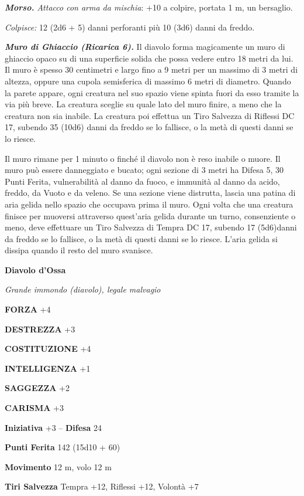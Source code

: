 \begin{multicols}{2}
\textit{\textbf{Morso.} Attacco con arma da mischia}: +10 a colpire, portata 1 m, un bersaglio.

\textit{Colpisce:} 12 (2d6 + 5) danni perforanti più 10 (3d6) danni da freddo.

\textit{\textbf{Muro di Ghiaccio (Ricarica 6).}} Il diavolo forma magicamente un muro di ghiaccio opaco su di una superficie solida che possa vedere entro 18 metri da lui. Il muro è spesso 30 centimetri e largo fino a 9 metri per un massimo di 3 metri di altezza, oppure  una cupola semisferica di massimo 6 metri di diametro. Quando la  parete appare, ogni creatura nel suo spazio viene spinta fuori da esso  tramite la via più breve. La creatura sceglie su quale lato del muro  finire, a meno che la creatura non sia inabile. La creatura poi  effettua un Tiro Salvezza di Riflessi DC 17, subendo 35 (10d6) danni da freddo se lo fallisce, o la metà di questi danni se lo riesce.

Il muro rimane per 1 minuto o finché il diavolo non è reso inabile o muore. Il muro può essere danneggiato e bucato; ogni sezione di 3 metri ha Difesa 5, 30 Punti Ferita, vulnerabilità al danno da fuoco, e immunità al danno da acido, freddo, da Vuoto e da veleno. Se una sezione viene distrutta, lascia una patina di aria gelida nello spazio che occupava prima il muro. Ogni volta che una creatura finisce per muoversi attraverso quest'aria gelida durante un turno, consenziente o meno, deve effettuare un Tiro Salvezza di Tempra DC 17, subendo 17 (5d6)danni da freddo se lo fallisce, o la metà di questi danni se lo riesce. L'aria gelida si dissipa quando il resto del muro svanisce.


\medskip{}\textbf{Diavolo d'Ossa}

\textit{Grande immondo (diavolo), legale malvagio}

\textbf{FORZA} +4

\textbf{DESTREZZA} +3

\textbf{COSTITUZIONE} +4

\textbf{INTELLIGENZA} +1

\textbf{SAGGEZZA} +2

\textbf{CARISMA} +3

\textbf{Iniziativa} +3 -- \textbf{Difesa} 24

\textbf{Punti Ferita} 142 (15d10 + 60)

\textbf{Movimento} 12 m, volo 12 m

\textbf{Tiri Salvezza} Tempra +12, Riflessi +12, Volontà +7


\end{multicols}
